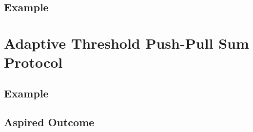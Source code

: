 \subsection{Example}\label{subsec:exampleDAB}

\section{Adaptive Threshold Push-Pull Sum Protocol}\label{sec:adaptivethresholdPPS}

\subsection{Example}\label{subsec:exampleAdaptiveThresholdPPS}
\subsection{Aspired Outcome}\label{subsec:aspiredOutcomeAdaptiveThresholdPPS}